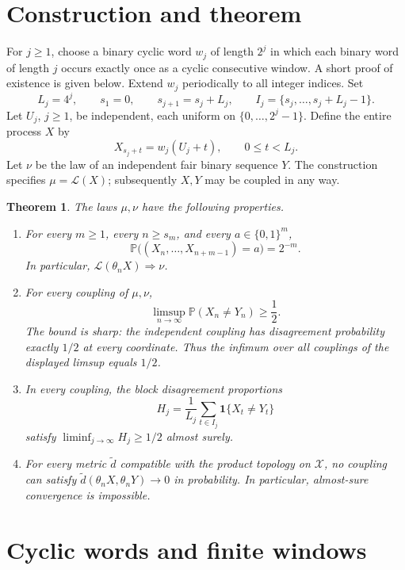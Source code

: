 \documentclass[11pt]{article}
\newtheorem{theorem}{Theorem}
\newcommand{\Law}{\mathcal L}
\newcommand{\Prob}{\mathbb P}
\newcommand{\ind}{\mathbf 1}
\begin{document}
\section{Construction and theorem}

For \(j\geq1\), choose a binary cyclic word \(w_j\) of length \(2^j\) in which each binary word of length \(j\) occurs exactly once as a cyclic consecutive window. A short proof of existence is given below. Extend \(w_j\) periodically to all integer indices. Set
\[
 L_j=4^j,\qquad s_1=0,\qquad s_{j+1}=s_j+L_j,
 \qquad I_j=\{s_j,\ldots,s_j+L_j-1\}.
\]
Let \(U_j\), \(j\geq1\), be independent, each uniform on
\(\{0,\ldots,2^j-1\}\). Define the entire process \(X\) by
\[
 X_{s_j+t}=w_j(U_j+t),\qquad 0\leq t<L_j.
\]
Let \(\nu\) be the law of an independent fair binary sequence \(Y\).
The construction specifies \(\mu=\Law(X)\); subsequently \(X,Y\) may be coupled in any way.

\begin{theorem}\label{thm:main}
The laws \(\mu,\nu\) have the following properties.
\begin{enumerate}
\item For every \(m\geq1\), every \(n\geq s_m\), and every \(a\in\{0,1\}^m\),
\[
 \Prob\big((X_n,\ldots,X_{n+m-1})=a\big)=2^{-m}.
\]
In particular, \(\Law(\theta_nX)\Rightarrow\nu\).
\item For every coupling of \(\mu,\nu\),
\[
 \limsup_{n\to\infty}\Prob(X_n\ne Y_n)\geq\frac12.
\]
The bound is sharp: the independent coupling has disagreement probability exactly \(1/2\) at every coordinate. Thus the infimum over all couplings of the displayed limsup equals \(1/2\).
\item In every coupling, the block disagreement proportions
\[
 H_j=\frac1{L_j}\sum_{t\in I_j}\ind\{X_t\ne Y_t\}
\]
satisfy \(\liminf_{j\to\infty}H_j\geq1/2\) almost surely.
\item For every metric \(\widetilde d\) compatible with the product topology on \(\mathcal X\), no coupling can satisfy
\(\widetilde d(\theta_nX,\theta_nY)\to0\) in probability. In particular, almost-sure convergence is impossible.
\end{enumerate}
\end{theorem}

\section{Cyclic words and finite windows}
\end{document}
